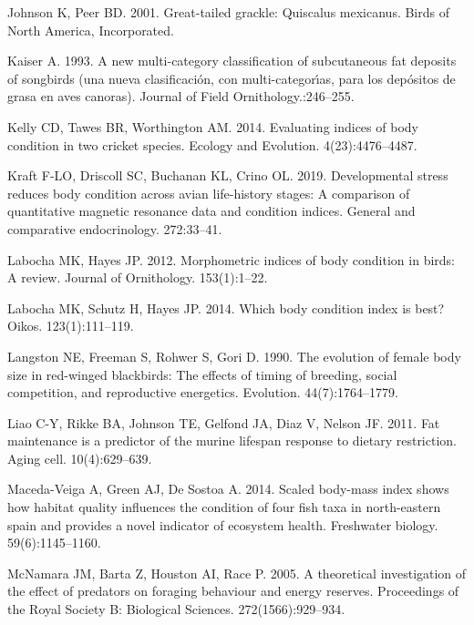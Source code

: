 \documentclass[
]{article}
\begin{document}
\leavevmode\hypertarget{ref-johnson2001great}{}%
Johnson K, Peer BD. 2001. Great-tailed grackle: Quiscalus mexicanus.
Birds of North America, Incorporated.

\leavevmode\hypertarget{ref-kaiser1993new}{}%
Kaiser A. 1993. A new multi-category classification of subcutaneous fat
deposits of songbirds (una nueva clasificación, con multi-categorı́as,
para los depósitos de grasa en aves canoras). Journal of Field
Ornithology.:246--255.

\leavevmode\hypertarget{ref-kelly2014evaluating}{}%
Kelly CD, Tawes BR, Worthington AM. 2014. Evaluating indices of body
condition in two cricket species. Ecology and Evolution.
4(23):4476--4487.

\leavevmode\hypertarget{ref-kraft2019developmental}{}%
Kraft F-LO, Driscoll SC, Buchanan KL, Crino OL. 2019. Developmental
stress reduces body condition across avian life-history stages: A
comparison of quantitative magnetic resonance data and condition
indices. General and comparative endocrinology. 272:33--41.

\leavevmode\hypertarget{ref-labocha2012morphometric}{}%
Labocha MK, Hayes JP. 2012. Morphometric indices of body condition in
birds: A review. Journal of Ornithology. 153(1):1--22.

\leavevmode\hypertarget{ref-labocha2014body}{}%
Labocha MK, Schutz H, Hayes JP. 2014. Which body condition index is
best? Oikos. 123(1):111--119.

\leavevmode\hypertarget{ref-langston1990evolution}{}%
Langston NE, Freeman S, Rohwer S, Gori D. 1990. The evolution of female
body size in red-winged blackbirds: The effects of timing of breeding,
social competition, and reproductive energetics. Evolution.
44(7):1764--1779.

\leavevmode\hypertarget{ref-liao2011fat}{}%
Liao C-Y, Rikke BA, Johnson TE, Gelfond JA, Diaz V, Nelson JF. 2011. Fat
maintenance is a predictor of the murine lifespan response to dietary
restriction. Aging cell. 10(4):629--639.

\leavevmode\hypertarget{ref-maceda2014scaled}{}%
Maceda-Veiga A, Green AJ, De Sostoa A. 2014. Scaled body-mass index
shows how habitat quality influences the condition of four fish taxa in
north-eastern spain and provides a novel indicator of ecosystem health.
Freshwater biology. 59(6):1145--1160.

\leavevmode\hypertarget{ref-mcnamara2005theoretical}{}%
McNamara JM, Barta Z, Houston AI, Race P. 2005. A theoretical
investigation of the effect of predators on foraging behaviour and
energy reserves. Proceedings of the Royal Society B: Biological
Sciences. 272(1566):929--934.
\end{document}

